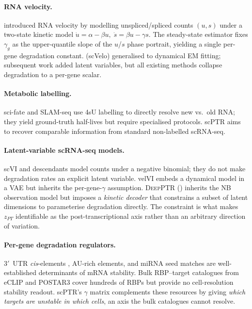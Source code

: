 \documentclass{article}
\begin{document}
\paragraph{RNA velocity.} \citet{lamanno2018} introduced RNA velocity by
modelling unspliced/spliced counts $(u,s)$ under a two-state kinetic model
\(\dot u = \alpha - \beta u,\; \dot s = \beta u - \gamma s\). The
steady-state estimator fixes $\gamma_g$ as the upper-quantile slope of the
$u$/$s$ phase portrait, yielding a single per-gene degradation constant.
\citet{bergen2020} (scVelo) generalised to dynamical EM fitting; subsequent
work \citep{velvi,unitvelo} added latent variables, but all existing
methods collapse degradation to a per-gene scalar.

\paragraph{Metabolic labelling.} sci-fate \citep{cao2020} and SLAM-seq
\citep{herzog2017} use 4sU labelling to directly resolve new vs.\ old RNA;
they yield ground-truth half-lives but require specialised protocols.
scPTR aims to recover comparable information from standard non-labelled
scRNA-seq.

\paragraph{Latent-variable scRNA-seq models.} scVI \citep{lopez2018} and
descendants model counts under a negative binomial; they do not make
degradation rates an explicit latent variable. velVI \citep{velvi} embeds a
dynamical model in a VAE but inherits the per-gene-$\gamma$ assumption.
\textsc{DeepPTR} () inherits the NB observation model but
imposes a \emph{kinetic decoder} that constrains a subset of latent dimensions
to parameterise degradation directly. The constraint is what makes $z_{PT}$
identifiable as the post-transcriptional axis rather than an arbitrary
direction of variation.

\paragraph{Per-gene degradation regulators.} 3$'$~UTR \textit{cis}-elements
\citep{hentze2018}, AU-rich elements, and miRNA seed matches
\citep{lewis2005} are well-established determinants of mRNA stability. Bulk
RBP--target catalogues from eCLIP \citep{vannostrand2020} and POSTAR3 cover
hundreds of RBPs but provide no cell-resolution stability readout. scPTR's
$\gamma$ matrix complements these resources by giving \emph{which targets are
unstable in which cells}, an axis the bulk catalogues cannot resolve.
\end{document}
